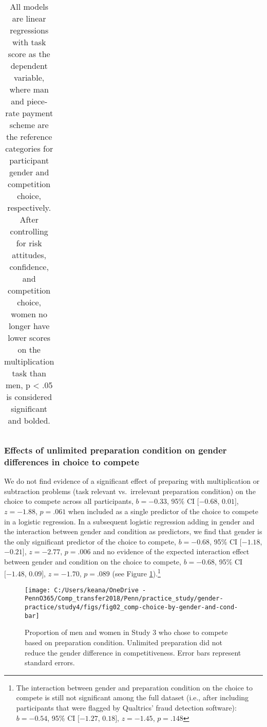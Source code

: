 \documentclass[letterpaper, nobind]{templates/ociamthesis}
\begin{document}
\begin{table}[ht]
\centering
\begingroup\fontsize{0.1pt}{0.1pt}\selectfont
\begin{tabular}{r}
   \\ 
 \end{tabular}
\endgroup
\caption{All models are linear regressions with task score as the dependent variable, where man and piece-rate payment scheme are the reference categories for participant gender and competition choice, respectively. After controlling for risk attitudes, confidence, and competition choice, women no longer have lower scores on the multiplication task than men, p < .05 is considered significant and bolded.} 
\label{tab:tab-task-scores-study4}
\end{table}

\hypertarget{effects-of-unlimited-preparation-condition-on-gender-differences-in-choice-to-compete}{%
\subsubsection{Effects of unlimited preparation condition on gender differences in choice to compete}\label{effects-of-unlimited-preparation-condition-on-gender-differences-in-choice-to-compete}}

We do not find evidence of a significant effect of preparing with multiplication or subtraction problems (task relevant vs.~irrelevant preparation condition) on the choice to compete across all participants, \(b = -0.33\), 95\% CI \([-0.68\), \(0.01]\), \(z = -1.88\), \(p = .061\) when included as a single predictor of the choice to compete in a logistic regression. In a subsequent logistic regression adding in gender and the interaction between gender and condition as predictors, we find that gender is the only significant predictor of the choice to compete, \(b = -0.68\), 95\% CI \([-1.18\), \(-0.21]\), \(z = -2.77\), \(p = .006\) and no evidence of the expected interaction effect between gender and condition on the choice to compete, \(b = -0.68\), 95\% CI \([-1.48\), \(0.09]\), \(z = -1.70\), \(p = .089\) (see Figure \ref{fig:s300}).\footnote{The interaction between gender and preparation condition on the choice to compete is still not significant among the full dataset (i.e., after including participants that were flagged by Qualtrics' fraud detection software): \(b = -0.54\), 95\% CI \([-1.27\), \(0.18]\), \(z = -1.45\), \(p = .148\)}

\begin{figure}

{\centering \texttt{[image: C:/Users/keana/OneDrive - PennO365/Comp\_transfer2018/Penn/practice\_study/gender-practice/study4/figs/fig02\_comp-choice-by-gender-and-cond-bar]} 

}

\caption{Proportion of men and women in Study 3 who chose to compete based on preparation condition. Unlimited preparation did not reduce the gender difference in competitiveness. Error bars represent standard errors.}\label{fig:s300}
\end{figure}
\end{document}
